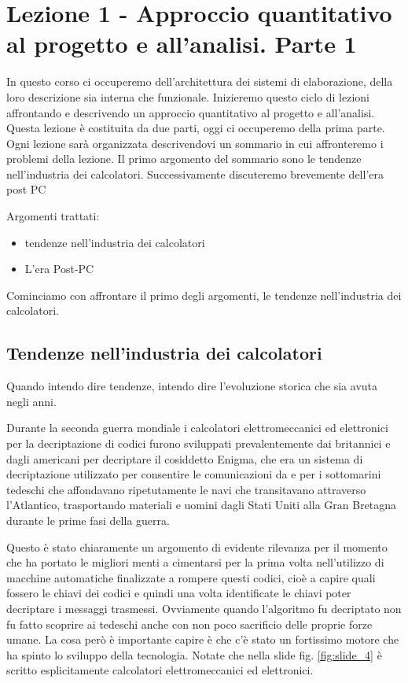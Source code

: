 \chapter{Lezione 1 - Approccio quantitativo al progetto e all'analisi. Parte 1}


In questo corso ci occuperemo dell'architettura dei sistemi di elaborazione, della loro descrizione sia interna che funzionale. Inizieremo questo ciclo di lezioni affrontando e descrivendo un approccio quantitativo al progetto e all'analisi. Questa lezione è costituita da due parti, oggi ci occuperemo della prima parte.
Ogni lezione sarà organizzata descrivendovi un sommario in cui affronteremo i problemi della lezione. Il primo argomento del sommario sono le tendenze nell'industria dei calcolatori. Successivamente discuteremo brevemente dell'era post PC


Argomenti trattati:
\begin{itemize}
    \item tendenze nell'industria dei calcolatori
    \item L'era Post-PC
\end{itemize}

Cominciamo con affrontare il primo degli argomenti, le tendenze nell'industria dei calcolatori.

\section{Tendenze nell'industria dei calcolatori}

Quando intendo dire tendenze, intendo dire l'evoluzione storica che sia avuta negli anni.

Durante la seconda guerra mondiale i calcolatori elettromeccanici ed elettronici per la decriptazione di codici furono sviluppati prevalentemente dai britannici e dagli americani per decriptare il cosiddetto Enigma, che era un sistema di decriptazione utilizzato per consentire le comunicazioni da e per i sottomarini tedeschi che affondavano ripetutamente le navi che transitavano attraverso l'Atlantico, trasportando materiali e uomini dagli Stati Uniti alla Gran Bretagna durante le prime fasi della guerra.

Questo è stato chiaramente un argomento di evidente rilevanza per il momento che ha portato le migliori menti a cimentarsi per la prima volta nell'utilizzo di macchine automatiche finalizzate a rompere questi codici, cioè a capire quali fossero le chiavi dei codici e quindi una volta identificate le chiavi poter decriptare i messaggi trasmessi. Ovviamente quando l'algoritmo fu decriptato non fu fatto scoprire ai tedeschi anche con non poco sacrificio delle proprie forze umane.
La cosa però è importante capire è che c'è stato un fortissimo motore che ha spinto lo sviluppo della tecnologia.
Notate che nella slide fig. \ref{fig:slide_4} è scritto esplicitamente calcolatori elettromeccanici ed elettronici.

